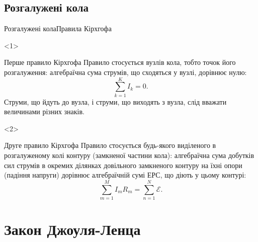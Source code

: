 \documentclass[onlytextwidth]{beamer}
\begin{document}
\subsection{Розгалужені кола}



\begin{frame}{Розгалужені кола}{Правила Кірхгофа}
	\begin{onlyenv}
		\begin{block}{Перше правило Кірхгофа}\justifying
			Правило стосується \alert{вузлів} кола, тобто точок його розгалуження: алгебраїчна сума струмів, що сходяться у вузлі,
			дорівнює нулю:
			\begin{equation*}
				\sum\limits_{k=1}^{K} I_k = 0.
			\end{equation*}
			\alert{Струми, що йдуть до вузла, і струми, що виходять з вузла, слід вважати величинами різних знаків.}
		\end{block}
		\begin{center}
            
        \end{center}
	\end{onlyenv}
	\begin{onlyenv}
		\begin{block}{Друге правило Кірхгофа}\justifying
			Правило стосується будь-якого виділеного в розгалуженому колі \alert{контуру (замкненої частини кола)}: алгебраїчна сума добутків сил
			струмів в окремих ділянках
			довільного замкненого контуру на їхні опори (падіння напруги) дорівнює алгебраїчній сумі ЕРС, що діють у цьому контурі:
			\begin{equation*}
				\sum\limits_{m=1}^{M} I_m R_m = \sum\limits_{n=1}^{N} \mathcal{E}.
			\end{equation*}
		\end{block}
		\begin{center}
            
        \end{center}
	\end{onlyenv}
\end{frame}




\section{Закон Джоуля-Ленца }
\end{document}
